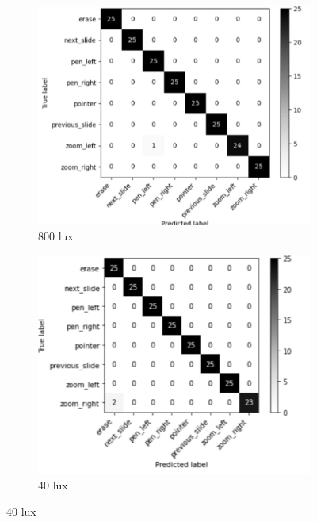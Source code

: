 \begin{figure}[!htb]
  \centering
  \begin{subfigure}{0.47\textwidth}
    \centering
    \includegraphics[width=\linewidth]{gambar/pengujian-cahaya/800lux.png}
    \caption{800 lux}
    \label{fig:Distribusi Hasil Pengujian dengan Variasi Pencahayaan 800 lux} 
  \end{subfigure}
  \hfill
  \quad
  \begin{subfigure}{0.48\textwidth}
    \centering
    \includegraphics[width=\linewidth]{gambar/pengujian-cahaya/40lux.png}
    \caption{40 lux}
    \label{fig:Distribusi Hasil Pengujian dengan Variasi Pencahayaan 40 lux} 

\end{subfigure}
\end{figure}
